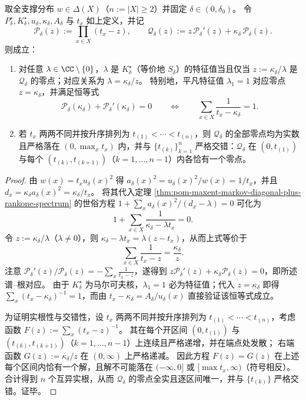 \begin{theorem}\label{thm:pom-maxent-markov-laguerre-secular-spectrum}
取全支撑分布 \(w\in\Delta(X)\)（\(n:=|X|\ge 2\)）并固定 \(\delta\in(0,\delta_0)\)。
令 \(P^\star_\delta,K^\star_\delta,u_\delta,\kappa_\delta,A_\delta\) 与 \(t_x\) 如上定义，并记
\[
\mathcal P_\delta(z):=\prod_{x\in X}(t_x-z),\qquad
\mathcal Q_\delta(z):=z\,\mathcal P_\delta'(z)+\kappa_\delta\,\mathcal P_\delta(z).
\]
则成立：
\begin{enumerate}
  \item 对任意 \(\lambda\in\CC\setminus\{0\}\)，\(\lambda\) 是 \(K^\star_\delta\)（等价地 \(S_\delta\)）的特征值当且仅当
  \(
  z:=\kappa_\delta/\lambda
  \)
  是 \(\mathcal Q_\delta\) 的零点；对应关系为 \(\lambda=\kappa_\delta/z\)。
  特别地，平凡特征值 \(\lambda_1=1\) 对应零点 \(z=\kappa_\delta\)，并满足恒等式
  \[
  \mathcal P_\delta(\kappa_\delta)+\mathcal P_\delta'(\kappa_\delta)=0
  \qquad\Longleftrightarrow\qquad
  \sum_{x\in X}\frac{1}{t_x-\kappa_\delta}=1.
  \]
  \item 若 \(t_x\) 两两不同并按升序排列为 \(t_{(1)}<\cdots<t_{(n)}\)，则 \(\mathcal Q_\delta\) 的全部零点均为实数且严格落在 \((0,\max_x t_x)\) 内，并与 \(\{t_{(k)}\}_{k=1}^{n}\) 严格交错：\(\mathcal Q_\delta\) 在 \((0,t_{(1)})\) 与每个 \((t_{(k)},t_{(k+1)})\)（\(k=1,\dots,n-1\)）内各恰有一个零点。
\end{enumerate}
\end{theorem}
\begin{proof}
由 \(w(x)=t_xu_\delta(x)^2\) 得 \(a_\delta(x)^2=u_\delta(x)^2/w(x)=1/t_x\)，并且
\(
d_x=\kappa_\delta a_\delta(x)^2=\kappa_\delta/t_x
\)。
将其代入定理 \ref{thm:pom-maxent-markov-diagonal-plus-rankone-spectrum} 的世俗方程
\(
1+\sum_x a_\delta(x)^2/(d_x-\lambda)=0
\)
可化为
\[
1+\sum_{x\in X}\frac{1}{\kappa_\delta-\lambda t_x}=0.
\]
令 \(z:=\kappa_\delta/\lambda\)（\(\lambda\ne 0\)），则 \(\kappa_\delta-\lambda t_x=\lambda(z-t_x)\)，从而上式等价于
\[
\sum_{x\in X}\frac{1}{t_x-z}=\frac{\kappa_\delta}{z}.
\]
注意 \(\mathcal P_\delta'(z)/\mathcal P_\delta(z)=-\sum_x\frac{1}{t_x-z}\)，遂得到
\(
z\mathcal P_\delta'(z)+\kappa_\delta\mathcal P_\delta(z)=0
\)，即所述谱--根对应。
由于 \(K^\star_\delta\) 为马尔可夫核，\(\lambda_1=1\) 必为特征值；代入 \(z=\kappa_\delta\) 即得 \(\sum_x (t_x-\kappa_\delta)^{-1}=1\)，而由 \(t_x-\kappa_\delta=A_\delta/u_\delta(x)\) 直接验证该恒等式成立。
\par
为证明实根性与交错性，设 \(t_x\) 两两不同并按升序排列为 \(t_{(1)}<\cdots<t_{(n)}\)，考虑函数 \(F(z):=\sum_x (t_x-z)^{-1}\)。
其在每个开区间 \((0,t_{(1)})\) 与 \((t_{(k)},t_{(k+1)})\)（\(k=1,\dots,n-1\)）上连续且严格递增，并在端点处发散；
右端函数 \(G(z):=\kappa_\delta/z\) 在 \((0,\infty)\) 上严格递减。
因此方程 \(F(z)=G(z)\) 在上述每个区间内恰有一个解，且解不可能落在 \((-\infty,0]\) 或 \([\max t_x,\infty)\)（符号相反）。
合计得到 \(n\) 个互异实根，从而 \(\mathcal Q_\delta\) 的零点全实且逐区间唯一，并与 \(\{t_{(k)}\}\) 严格交错。证毕。
\end{proof}

